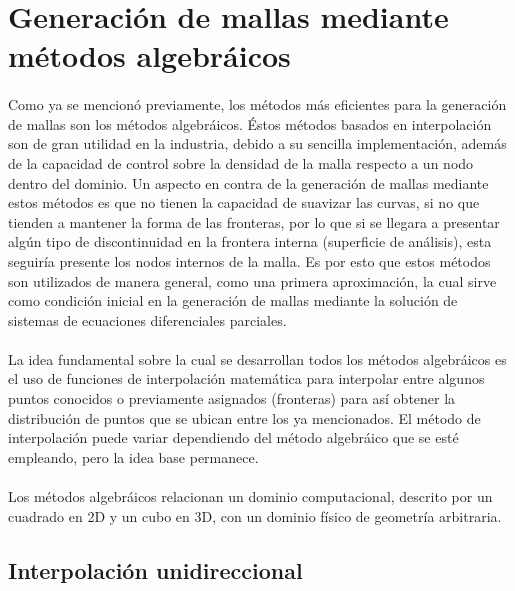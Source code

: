 \documentclass[letterpaper, openright, 12pt]{book}
\begin{document}
\section{Generación de mallas mediante métodos algebráicos}
    \paragraph*{}
        Como ya se mencionó previamente, los métodos más eficientes para la
        generación de mallas son los métodos algebráicos. Éstos métodos basados
        en interpolación son de gran utilidad en la industria, debido a su
        sencilla implementación, además de la capacidad de control sobre la
        densidad de la malla respecto a un nodo dentro del dominio. Un aspecto
        en contra de la generación de mallas mediante estos métodos es que no
        tienen la capacidad de suavizar las curvas, si no que tienden a mantener
        la forma de las fronteras, por lo que si se llegara a presentar algún
        tipo de discontinuidad en la frontera interna (superficie de análisis),
        esta seguiría presente los nodos internos de la malla. Es por esto que
        estos métodos son utilizados de manera general, como una primera
        aproximación, la cual sirve como condición inicial en la generación de
        mallas mediante la solución de sistemas de ecuaciones diferenciales
        parciales.\cite{farrashkhalvat}
    \paragraph*{}
        La idea fundamental sobre la cual se desarrollan todos los métodos
        algebráicos es el uso de funciones de interpolación matemática para
        interpolar entre algunos puntos conocidos o previamente asignados
        (fronteras) para así obtener la distribución de puntos que se ubican
        entre los ya mencionados. El método de interpolación puede variar
        dependiendo del método algebráico que se esté empleando, pero la idea
        base permanece.\cite{siladicParabolic}
    \paragraph*{}
        Los métodos algebráicos relacionan un dominio computacional, descrito
        por un cuadrado en 2D y un cubo en 3D, con un dominio físico de
        geometría arbitraria.

    \subsection{Interpolación unidireccional}
\end{document}
